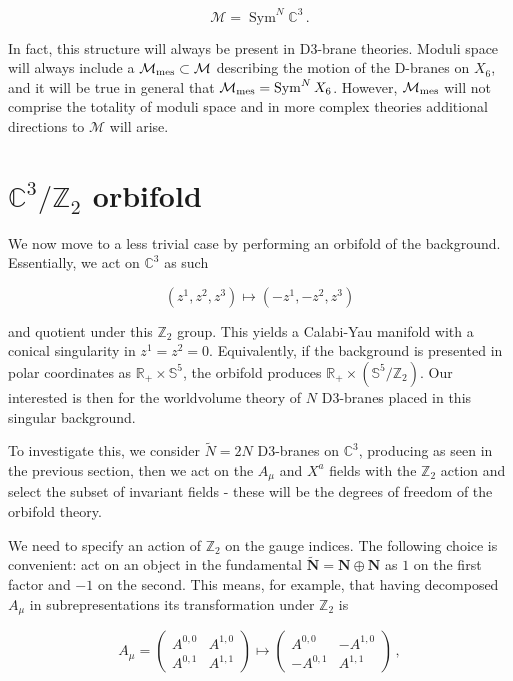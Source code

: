 \begin{equation}
	\mathcal{M} = \operatorname{Sym}^N \mathbb{C}^3\,.
	\label{}
\end{equation}

In fact, this structure will always be present in D3-brane theories. Moduli space will always include a $\mathcal{M}_\mathrm{mes} \subset \mathcal{M}$ describing the motion of the D-branes on $X_6$, and it will be true in general that $\mathcal{M}_\mathrm{mes} = \operatorname{Sym}^N X_6$. However, $\mathcal{M}_\mathrm{mes}$ will not comprise the totality of moduli space and in more complex theories additional directions to $\mathcal{M}$ will arise.

\section{$\mathbb{C}^3/\mathbb{Z}_2$ orbifold}

We now move to a less trivial case by performing an orbifold of the background. Essentially, we act on $\mathbb{C}^3$ as such

\begin{equation}
	(z^1, z^2, z^3) \mapsto (-z^1, -z^2, z^3)
	\label{}
\end{equation}

and quotient under this $\mathbb{Z}_2$ group. This yields a Calabi-Yau manifold with a conical singularity in $z^1 = z^2 =0$. Equivalently, if the background is presented in polar coordinates as $\mathbb{R}_+ \times \mathbb{S}^5$, the orbifold produces $\mathbb{R}_+ \times (\mathbb{S}^5 / \mathbb{Z}_2)$. Our interested is then for the worldvolume theory of $N$ D3-branes placed in this singular background.

To investigate this, we consider $\tilde N = 2N$ D3-branes on $\mathbb{C}^3$, producing \SYM as seen in the previous section, then we act on the $A_\mu$ and $X^a$ fields with the $\mathbb{Z}_2$ action and select the subset of invariant fields - these will be the degrees of freedom of the orbifold theory.

We need to specify an action of $\mathbb{Z}_2$ on the gauge indices. The following choice is convenient: act on an object in the fundamental $\mathbf{\tilde N} = \mathbf{N} \oplus \mathbf{N}$ as $1$ on the first factor and $-1$ on the second. This means, for example, that having decomposed $A_\mu$ in subrepresentations its transformation under $\mathbb{Z}_2$ is

\begin{equation}
	A_\mu = \begin{pmatrix}
		A^{0,0} & A^{1,0} \\
		A^{0,1} & A^{1,1}
	\end{pmatrix} \mapsto \begin{pmatrix}
		A^{0,0} & -A^{1,0} \\
		-A^{0,1} & A^{1,1}
	\end{pmatrix}\,,
\end{equation}

